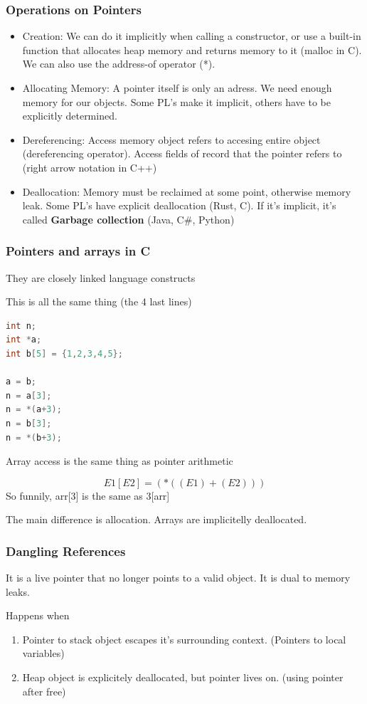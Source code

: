 \documentclass{article}
\begin{document}
\subsubsection{Operations on Pointers}
\begin{itemize}
  \item Creation: We can do it implicitly when calling a constructor, or use a built-in function that allocates heap memory and returns memory to it (malloc in C). We can also use the address-of operator (*).
  \item Allocating Memory: A pointer itself is only an adress. We need enough memory for our objects. Some PL's make it implicit, others have to be explicitly determined.
  \item Dereferencing: Access memory object refers to accesing entire object (dereferencing operator). Access fields of record that the pointer refers to (right arrow notation in C++)
  \item Deallocation: Memory must be reclaimed at some point, otherwise memory leak. Some PL's have explicit deallocation (Rust, C). If it's implicit, it's called \textbf{Garbage collection} (Java, C\#, Python)
\end{itemize}

\subsubsection{Pointers and arrays in C}
They are closely linked language constructs

This is all the same thing (the 4 last lines)
\begin{lstlisting}[language=C]
int n;
int *a;
int b[5] = {1,2,3,4,5};

a = b;
n = a[3];
n = *(a+3);
n = b[3];
n = *(b+3);
\end{lstlisting}

Array access is the same thing as pointer arithmetic

\[E1[E2] = (*((E1) + (E2)))\]
So funnily, arr[3] is the same as 3[arr]

The main difference is allocation. Arrays are implicitelly deallocated.

\subsubsection{Dangling References}
It is a live pointer that no longer points to a valid object. It is dual to memory leaks.

Happens when
\begin{enumerate}
  \item Pointer to stack object escapes it's surrounding context. (Pointers to local variables)
  \item Heap object is explicitely deallocated, but pointer lives on. (using pointer after free)
\end{enumerate}
\end{document}
